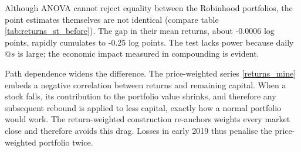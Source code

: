 Although ANOVA cannot reject equality between the Robinhood portfolios, the point estimates themselves are not identical (compare table \ref{tab:returns_st_before}).
The gap in their mean returns, about -0.0006 log points, rapidly cumulates to -0.25 log points. 
The test lacks power because daily $@s$ is large; the economic impact measured in compounding is evident.

Path dependence widens the difference.
The price-weighted series \ref{returns_mine} embeds a negative correlation between returns and remaining capital.
When a stock falls, its contribution to the portfolio value shrinks, and therefore any subsequent rebound is applied to less capital, exactly how a normal portfolio would work. 
The return-weighted construction re-anchors weights every market close and therefore avoids this drag.
Losses in early 2019 thus penalise the price-weighted portfolio twice.  





